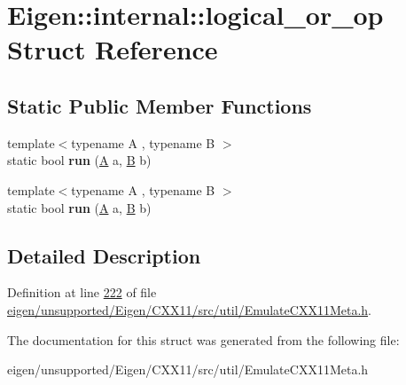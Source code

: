 \hypertarget{struct_eigen_1_1internal_1_1logical__or__op}{}\section{Eigen\+:\+:internal\+:\+:logical\+\_\+or\+\_\+op Struct Reference}
\label{struct_eigen_1_1internal_1_1logical__or__op}
\subsection*{Static Public Member Functions}
\begin{DoxyCompactItemize}
\item 
\mbox{\label{struct_eigen_1_1internal_1_1logical__or__op_ae5c09bd6d3b8c9ad8de1f0e33e01b59e}} 
{\footnotesize template$<$typename A , typename B $>$ }\\static bool {\bfseries run} (\hyperlink{group___core___module_class_eigen_1_1_matrix}{A} a, \hyperlink{group___core___module_class_eigen_1_1_matrix}{B} b)
\item 
\mbox{\label{struct_eigen_1_1internal_1_1logical__or__op_ae5c09bd6d3b8c9ad8de1f0e33e01b59e}} 
{\footnotesize template$<$typename A , typename B $>$ }\\static bool {\bfseries run} (\hyperlink{group___core___module_class_eigen_1_1_matrix}{A} a, \hyperlink{group___core___module_class_eigen_1_1_matrix}{B} b)
\end{DoxyCompactItemize}


\subsection{Detailed Description}


Definition at line \hyperlink{eigen_2unsupported_2_eigen_2_c_x_x11_2src_2util_2_emulate_c_x_x11_meta_8h_source_l00222}{222} of file \hyperlink{eigen_2unsupported_2_eigen_2_c_x_x11_2src_2util_2_emulate_c_x_x11_meta_8h_source}{eigen/unsupported/\+Eigen/\+C\+X\+X11/src/util/\+Emulate\+C\+X\+X11\+Meta.\+h}.



The documentation for this struct was generated from the following file\+:\begin{DoxyCompactItemize}
\item 
eigen/unsupported/\+Eigen/\+C\+X\+X11/src/util/\+Emulate\+C\+X\+X11\+Meta.\+h\end{DoxyCompactItemize}
